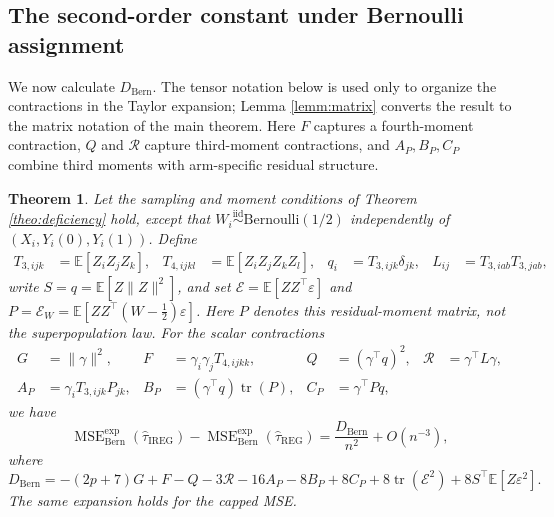 \documentclass{article}
\newcommand{\EEE}{\mathbb{E}}
\DeclareMathOperator{\MSE}{MSE}
\DeclareMathOperator{\tr}{tr}
\newcommand{\Bern}{\mathrm{Bern}}
\newcommand{\IREG}{\mathrm{IREG}}
\newcommand{\REG}{\mathrm{REG}}
\newcommand{\MSEexp}{\MSE^{\mathrm{exp}}}
\theoremstyle{plain}
\newtheorem{theo}[prop]{Theorem}
\theoremstyle{definition}
\theoremstyle{remark}
\begin{document}
\subsection{The second-order constant under Bernoulli assignment}

We now calculate $D_\Bern$. The tensor notation below is used only to
organize the contractions in the Taylor expansion; Lemma
\ref{lemm:matrix} converts the result to the matrix notation of the main
theorem. Here $F$ captures a fourth-moment contraction, $Q$ and
$\mathcal R$ capture third-moment contractions, and $A_P,B_P,C_P$
combine third moments with arm-specific residual structure.

\begin{theo}
\label{theo:bern_deficiency}
Let the sampling and moment conditions of Theorem \ref{theo:deficiency} hold, except that
$W_i\stackrel{\mathrm{iid}}{\sim}\text{Bernoulli}(1/2)$ independently of $(X_i,Y_i(0),Y_i(1))$. Define
\begin{align}
T_{3,ijk} &= \EEE[Z_iZ_jZ_k],
&
T_{4,ijkl} &= \EEE[Z_iZ_jZ_kZ_l],
&
q_i &= T_{3,ijk}\delta_{jk},
&
L_{ij} &= T_{3,iab}T_{3,jab},
\end{align}
write $S=q=\EEE[Z\|Z\|^2]$, and set $\mathcal E=\EEE[ZZ^\top\varepsilon]$ and $P=\mathcal E_W=\EEE[ZZ^\top(W-\tfrac12)\varepsilon]$. Here $P$ denotes this residual-moment matrix, not the superpopulation law. For the scalar contractions
\begin{align}
G&=\|\gamma\|^2,
&
F&=\gamma_i\gamma_jT_{4,ijkk},
&
Q&=(\gamma^\top q)^2,
&
\mathcal R&=\gamma^\top L\gamma,
\\
A_P&=\gamma_iT_{3,ijk}P_{jk},
&
B_P&=(\gamma^\top q)\tr(P),
&
C_P&=\gamma^\top Pq,
\end{align}
we have
\begin{equation}
\label{eq:bern_mse_diff}
\MSEexp_{\Bern}(\hat{\tau}_\IREG)
-
\MSEexp_{\Bern}(\hat{\tau}_\REG)
=
\frac{D_{\Bern}}{n^2}+O(n^{-3}),
\end{equation}
where
\begin{equation}
\label{eq:Dbern}
D_{\Bern}
=
-(2p+7)G
+F-Q-3\mathcal R
-16A_P-8B_P+8C_P
+8\tr(\mathcal E^2)
+8S^\top \EEE[Z\varepsilon^2].
\end{equation}
The same expansion holds for the capped MSE.
\end{theo}
\end{document}
